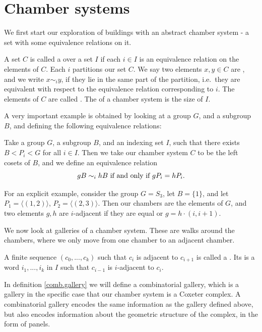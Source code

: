 \documentclass[11pt]{article}
\begin{document}
\section{Chamber systems}
We first start our exploration of buildings with an abstract chamber system - a set with some equivalence relations on it.  

\begin{definition}
    A set $C$ is called a  over a set $I$ if each $i\in I$ is an equivalence relation on the elements of $C$. Each $i$ partitions our set $C$. We say two elements $x,y\in C$ are , and we write $x\sim_{i} y$, if they lie in the same part of the partition, i.e.\ they are equivalent with respect to the equivalence relation corresponding to $i$. The elements of $C$ are called . The  of a chamber system is the size of $I$. 
\end{definition}


A very important example is obtained by looking at a group $G$, and a subgroup $B$, and defining the following equivalence relations: 

\begin{example}\label{S3}
    Take a group $G$, a subgroup $B$, and an indexing set $I$, such that there exists $B<P_i<G$ for all $i\in I$. Then we take our chamber system $C$ to be the left cosets of $B$, and we define an equivalence relation
    \[gB\sim_{i}hB \textnormal{ if and only if }gP_i=hP_i.\]

    For an explicit example, consider the group $G=S_3$, let $B=\{1\}$, and let $P_1=\langle (1,2)\rangle$, $P_2=\langle (2,3)\rangle$. Then our chambers are the elements of $G$, and two elements $g,h$ are $i$-adjacent if they are equal or $g=h\cdot(i,i+1)$. 
\end{example}

We now look at galleries of a chamber system. These are walks around the chambers, where we only move from one chamber to an adjacent chamber. 

\begin{definition}\label{gallery}
    A finite sequence $(c_0,...,c_k)$ such that $c_i$ is adjacent to $c_{i+1}$ is called a . Its  is a word $i_1,...,i_k$ in $I$ such that  $c_{i-1}$ is $i$-adjacent to $c_{i}$. 
\end{definition}

In definition \ref{comb.gallery} we will define a combinatorial gallery, which is a gallery in the specific case that our chamber system is a Coxeter complex. A combinatorial gallery encodes the same information as the gallery defined above, but also encodes information about the geometric structure of the complex, in the form of panels. 
\end{document}
